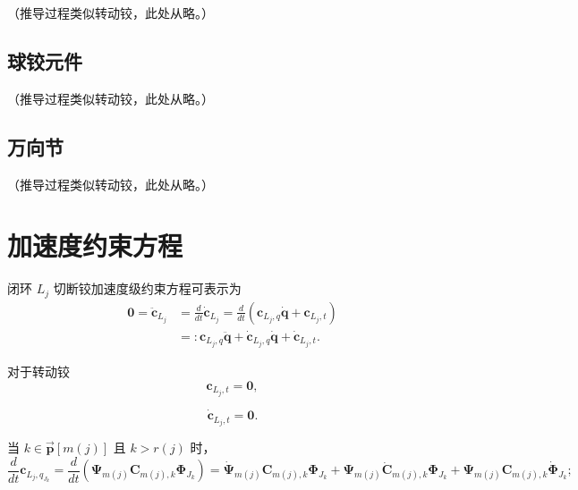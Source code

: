 （推导过程类似转动铰，此处从略。）

\subsection{球铰元件}

（推导过程类似转动铰，此处从略。）

\subsection{万向节}

（推导过程类似转动铰，此处从略。）

\section{加速度约束方程}

闭环 $L_j$ 切断铰加速度级约束方程可表示为
\begin{equation}\label{eq:11.21}
\begin{aligned}
\boldsymbol{0} = \ddot{\boldsymbol{c}}_{L_j} &= \frac{d}{dt} \dot{\boldsymbol{c}}_{L_j}
= \frac{d}{dt} \left( \boldsymbol{c}_{L_j,q} \dot{\boldsymbol{q}} + \boldsymbol{c}_{L_j,t} \right) \\
&=: \boldsymbol{c}_{L_j,q} \ddot{\boldsymbol{q}} + \dot{\boldsymbol{c}}_{L_j,q} \dot{\boldsymbol{q}} + \dot{\boldsymbol{c}}_{L_j,t}.
\end{aligned}
\end{equation}

对于转动铰
\begin{equation}\label{eq:11.22}
\boldsymbol{c}_{L_j,t} = \boldsymbol{0},
\end{equation}

\begin{equation}\label{eq:11.23}
\dot{\boldsymbol{c}}_{L_j,t} = \boldsymbol{0}.
\end{equation}

当 $k \in \vec{\boldsymbol{p}}[m(j)]$ 且 $k > r(j)$ 时，
\begin{equation}\label{eq:11.24}
\frac{d}{dt} \boldsymbol{c}_{L_j,q_{J_k}} = \frac{d}{dt} \left( \boldsymbol{\Psi}_{m(j)} \boldsymbol{C}_{m(j),k} \boldsymbol{\Phi}_{J_k} \right)
= \dot{\boldsymbol{\Psi}}_{m(j)} \boldsymbol{C}_{m(j),k} \boldsymbol{\Phi}_{J_k} + \boldsymbol{\Psi}_{m(j)} \dot{\boldsymbol{C}}_{m(j),k} \boldsymbol{\Phi}_{J_k} + \boldsymbol{\Psi}_{m(j)} \boldsymbol{C}_{m(j),k} \dot{\boldsymbol{\Phi}}_{J_k};
\end{equation}

